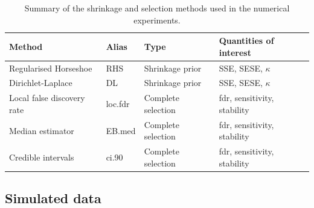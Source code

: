 \documentclass[american,]{article}
\theoremstyle{definition}
\begin{document}
\begin{table}[tp]
\scriptsize
\centering
\begin{tabular}{l|l|l|l}
  \hline
 Method & Alias & Type & Quantities of interest \\ 
  \hline
 Regularised Horseshoe & RHS & Shrinkage prior & SSE, SESE, $\kappa$ \\
 Dirichlet-Laplace & DL & Shrinkage prior & SSE, SESE, $\kappa$ \\
 Local false discovery rate & loc.fdr & Complete selection & fdr, sensitivity, stability \\
 Median estimator & EB.med & Complete selection & fdr, sensitivity, stability \\
 Credible intervals & ci.90 & Complete selection & fdr, sensitivity, stability \\
 \hline
\end{tabular}
\caption{Summary of the shrinkage and selection methods used in the numerical experiments.}
\label{tab:comparison}
\end{table}

\hypertarget{simulated-data}{%
\subsection{Simulated data}\label{simulated-data}}
\end{document}
